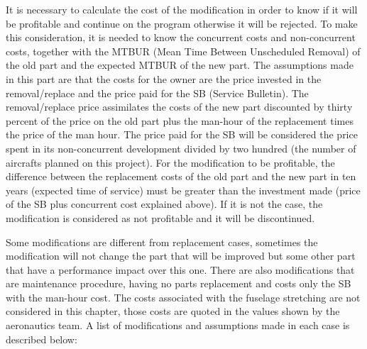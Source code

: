 It is necessary to calculate the cost of the modification in order to know if it will be profitable and continue on the program otherwise it will be rejected. To make this consideration, it is needed to know the concurrent costs and non-concurrent costs, together with the MTBUR (Mean Time Between Unscheduled Removal) of the old part and the expected MTBUR of the new part. The assumptions made in this part are that the costs for the owner are the price invested in the removal/replace and the price paid for the SB (Service Bulletin). The removal/replace price assimilates the costs of the new part discounted by thirty percent of the price on the old part plus the man-hour of the replacement times the price of the man hour. The price paid for the SB will be considered the price spent in its non-concurrent development divided by two hundred (the number of aircrafts planned on this project). For the modification to be profitable, the difference between the replacement costs of the old part and the new part in ten years (expected time of service) must be greater than the investment made (price of the SB plus concurrent cost explained above). If it is not the case, the modification is considered as not profitable and it will be discontinued.

Some modifications are different from replacement cases, sometimes the modification will not change the part that will be improved but some other part that have a performance impact over this one. There are also modifications that are maintenance procedure, having no parts replacement and costs only the SB with the man-hour cost.
The costs associated with the fuselage stretching are not considered in this chapter, those costs are quoted in the values shown by the aeronautics team.
A list of modifications and assumptions made in each case is described below:


